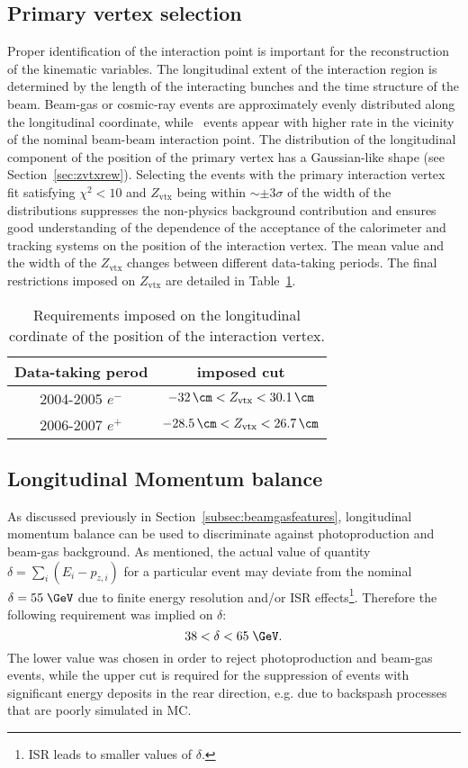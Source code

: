 \subsection{Primary vertex selection}
\label{subsec:vtxselect}
Proper identification of the interaction point is important for the reconstruction of the kinematic variables. The longitudinal extent of the interaction region is determined by the length of the interacting bunches and the time structure of the beam. Beam-gas or cosmic-ray events are approximately evenly distributed along the longitudinal coordinate, while \ep\, events appear with higher rate in the vicinity of the nominal beam-beam interaction point. The distribution of the longitudinal component of the position of the primary vertex has a Gaussian-like shape (see Section~\ref{sec:zvtxrew}). Selecting the events with the primary interaction vertex fit satisfying $\chi^2 < 10$ and $Z_\text{vtx}$ being within $\sim \pm 3\sigma$ of the width of the distributions suppresses the non-physics background contribution and ensures good understanding of the dependence of the acceptance of the calorimeter and tracking systems on the position of the interaction vertex. The mean value and the width of the $Z_\text{vtx}$ changes between different data-taking periods. The final restrictions imposed on $Z_\text{vtx}$ are detailed in Table~\ref{tab:zvxcut}.
\begin{table}[htbp]
	\centering
		\begin{tabular}{|c|c|}
			\hline
			Data-taking perod & imposed cut \\
			\hline
			\hline
			2004-2005 $e^{-}$ & $-32\,\cm<Z_\text{vtx}<30.1\,\cm$ \\
			2006-2007 $e^{+}$ & $-28.5\,\cm<Z_\text{vtx}<26.7\,\cm$ \\
			\hline
		\end{tabular}
	\caption{Requirements imposed on the longitudinal cordinate of the position of the interaction vertex.}
	\label{tab:zvxcut}
\end{table}

\subsection{Longitudinal Momentum balance}
\label{subsec:empzcut}
As discussed previously in Section~\ref{subsec:beamgasfeatures}, longitudinal momentum balance can be used to discriminate against photoproduction and beam-gas background. As mentioned, the actual value of quantity $\delta=\sum_i{\left(E_i-p_{z,i}\right)}$ for a particular event may deviate from the nominal $\delta=55\;\GeV$ due to finite energy resolution and/or ISR effects\footnote{ISR leads to smaller values of $\delta$.}. Therefore the following requirement was implied on $\delta$:
\begin{equation}
38 < \delta < 65\;\GeV.
\label{eq:epmzcut}
\end{equation}
The lower value was chosen in order to reject photoproduction and beam-gas events, while the upper cut is required for the suppression of events with significant energy deposits in the rear direction, e.g. due to backspash processes that are poorly simulated in MC.

